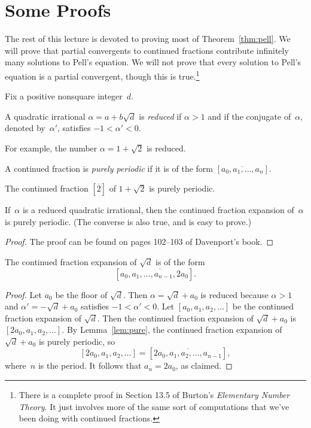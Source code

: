 \documentclass[11pt]{report}
\begin{document}
\section{Some Proofs}
The rest of this lecture is devoted to proving most of
Theorem~\ref{thm:pell}.  We will prove that partial convergents to
continued fractions contribute infinitely many solutions to Pell's
equation.  We will not prove that every solution to Pell's equation is
a partial convergent, though this is true.\footnote{There is a
complete proof in Section 13.5 of Burton's {\em Elementary Number
Theory}.  It just involves more of the same sort of computations that we've
been doing with continued fractions.}

Fix a positive nonsquare integer~$d$.

\begin{definition}
  A quadratic irrational $\alpha=a+b\sqrt{d}$ is {\em reduced} if
  $\alpha>1$ and if the conjugate of~$\alpha$, denoted by~$\alpha'$,
  satisfies $-1<\alpha'<0$.
\end{definition}
For example, the number $\alpha=1+\sqrt{2}$ is reduced.

\begin{definition}
  A continued fraction is {\em purely periodic}
  if it is of the form $[\overline{a_0,a_1,\ldots,a_n}]$.
\end{definition}
The continued fraction $[\overline{2}]$ of $1+\sqrt{2}$ is
purely periodic.

\begin{lemma}\label{lem:pure}
  If~$\alpha$ is a reduced quadratic irrational, then the continued
  fraction expansion of~$\alpha$ is purely periodic.  (The converse
  is also true, and is easy to prove.)
\end{lemma}
\begin{proof}
  The proof can be found on pages 102--103 of Davenport's book.
\end{proof}

\begin{lemma}\label{lemma:2a0}
  The continued fraction expansion of $\sqrt{d}$ is of the form
  $$[a_0, \overline{a_1, \ldots, a_{n-1}, 2 a_0}].$$
\end{lemma}
\begin{proof}
  Let $a_0$ be the floor of $\sqrt{d}$.
  Then $\alpha=\sqrt{d} + a_0$ is reduced because $\alpha>1$
  and $\alpha'=-\sqrt{d}+a_0$ satisfies $-1<\alpha'<0$.
  Let $[a_0, a_1, a_2, \ldots ]$ be the continued fraction
  expansion of $\sqrt{d}$.  Then the continued
  fraction expansion of $\sqrt{d}+a_0$ is
  $[2a_0, a_1, a_2, \ldots]$.
  By Lemma~\ref{lem:pure}, the continued fraction expansion of
  $\sqrt{d}+a_0$ is purely periodic, so
  $$[2a_0, a_1, a_2, \ldots] = [\overline{2a_0, a_1, a_2, \ldots, a_{n-1}}],$$
  where~$n$ is the period.  It follows that $a_n = 2 a_0$, as claimed.
\end{proof}
\end{document}
